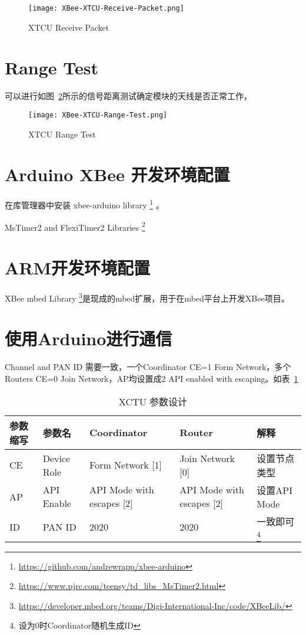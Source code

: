\begin{figure}[htbp]
    \centering
    \texttt{[image: XBee-XTCU-Receive-Packet.png]}
    \caption{XTCU Receive Packet}
    \label{fig:XBee-XTCU-Receive-Packet}
\end{figure}

\section{Range Test}

可以进行如图~\ref{fig:XBee-XTCU-Range-Test}所示的信号距离测试确定模块的天线是否正常工作，

\begin{figure}[htbp]
    \centering
    \texttt{[image: XBee-XTCU-Range-Test.png]}
    \caption{XTCU Range Test}
    \label{fig:XBee-XTCU-Range-Test}
\end{figure}


\section{Arduino XBee 开发环境配置}

在库管理器中安装 xbee-arduino library \footnote{\url{https://github.com/andrewrapp/xbee-arduino}} 。

MsTimer2 and FlexiTimer2 Libraries \footnote{\url{https://www.pjrc.com/teensy/td_libs_MsTimer2.html}}

\section{ARM开发环境配置}

XBee mbed Library \footnote{\url{https://developer.mbed.org/teams/Digi-International-Inc/code/XBeeLib/}}是现成的mbed扩展，用于在mbed平台上开发XBee项目。

\section{使用Arduino进行通信}

Channel and PAN ID 需要一致，一个Coordinator CE=1 Form Network，多个Routers CE=0 Join Network，AP均设置成2 API enabled with escaping。如表~\ref{tab:XCTU-Configs}

\begin{table}[htbp]
    \centering
    \begin{tabular}{@{}lllll@{}}
    \toprule
    参数缩写 & 参数名    & Coordinator & Router & 解释                         \\ \midrule
    CE & Device Role & Form Network {[}1{]}          & Join Network {[}0{]}          & 设置节点类型     \\
    AP & API Enable  & API Mode with escapes {[}2{]} & API Mode with escapes {[}2{]} & 设置API Mode \\
    ID   & PAN ID & 2020        & 2020   & 一致即可\footnote{设为0时Coordinator随机生成ID} \\ \bottomrule
    \end{tabular}
    \caption{XCTU 参数设计}
    \label{tab:XCTU-Configs}
\end{table}

